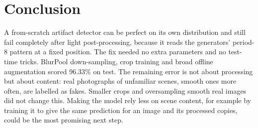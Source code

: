 \section{Conclusion}
\label{sec:conclusion}
A from-scratch artifact detector can be perfect on its own distribution and still fail completely after light post-processing, because it reads the generators' period-8 pattern at a fixed position. The fix needed no extra parameters and no test-time tricks. BlurPool down-sampling, crop training and broad offline augmentation scored 96.33\% on test. The remaining error is not about processing but about content: real photographs of unfamiliar scenes, smooth ones more often, are labelled as fakes. Smaller crops and oversampling smooth real images did not change this. Making the model rely less on scene content, for example by training it to give the same prediction for an image and its processed copies, could be the most promising next step.
